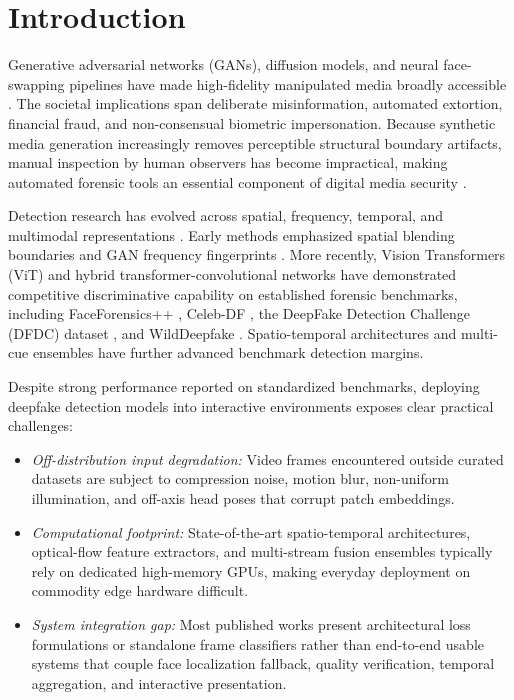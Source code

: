 \documentclass[conference]{IEEEtran}
\begin{document}
\begin{abstract}
self-supervised representation learning, contrastive learning, and multimodal audio-video analysis to improve robustness against emerging deepfake generation techniques and diverse real-world manipulation scenarios.
\end{abstract}


\section{Introduction}
Generative adversarial networks (GANs), diffusion models, and neural face-swapping pipelines have made high-fidelity manipulated media broadly accessible \cite{tolosana2020}. The societal implications span deliberate misinformation, automated extortion, financial fraud, and non-consensual biometric impersonation. Because synthetic media generation increasingly removes perceptible structural boundary artifacts, manual inspection by human observers has become impractical, making automated forensic tools an essential component of digital media security \cite{masood2023}.

Detection research has evolved across spatial, frequency, temporal, and multimodal representations \cite{verdoliva2020,lyu2020}. Early methods emphasized spatial blending boundaries and GAN frequency fingerprints \cite{marra2019,frank2020}. More recently, Vision Transformers (ViT) \cite{dosovitskiy2021} and hybrid transformer-convolutional networks have demonstrated competitive discriminative capability on established forensic benchmarks, including FaceForensics++ \cite{rossler2019}, Celeb-DF \cite{li2020}, the DeepFake Detection Challenge (DFDC) dataset \cite{dolhansky2020}, and WildDeepfake \cite{zi2020}. Spatio-temporal architectures and multi-cue ensembles \cite{haliassos2021,gu2022,subburaj2025,wang2023,tan2024} have further advanced benchmark detection margins.

Despite strong performance reported on standardized benchmarks, deploying deepfake detection models into interactive environments exposes clear practical challenges:
\begin{itemize}
\item \textit{Off-distribution input degradation:} Video frames encountered outside curated datasets are subject to compression noise, motion blur, non-uniform illumination, and off-axis head poses that corrupt patch embeddings.
\item \textit{Computational footprint:} State-of-the-art spatio-temporal architectures, optical-flow feature extractors, and multi-stream fusion ensembles typically rely on dedicated high-memory GPUs, making everyday deployment on commodity edge hardware difficult.
\item \textit{System integration gap:} Most published works present architectural loss formulations or standalone frame classifiers rather than end-to-end usable systems that couple face localization fallback, quality verification, temporal aggregation, and interactive presentation.
\end{itemize}
\end{document}
